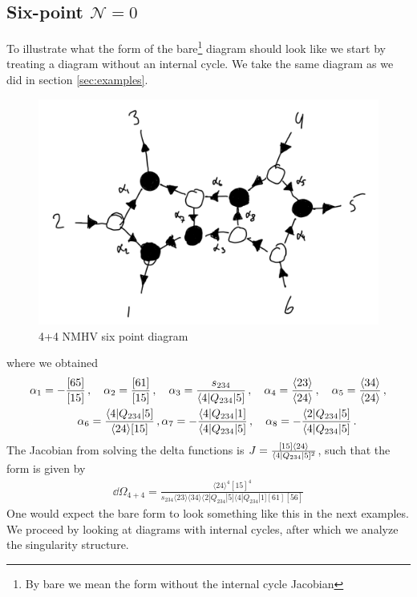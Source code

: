\documentclass[letter,11pt]{article}
\newcommand{\ab}[1]{\langle #1 \rangle}
\newcommand{\sqb}[1]{[ #1 ]}
\newcommand{\aMs}[3]{\langle #1|#2|#3]}  		%
\newcommand{\sab}[1]{s_{#1}}
\newcommand{\twhite}[1]{\textcolor{white}{#1}}
\begin{document}
\subsection{Six-point $\mathcal{N}=0$}
To illustrate what the form of the bare\footnote{By bare we mean the form without the internal cycle Jacobian} diagram should look like we start by treating a diagram without an internal cycle.  We take the same diagram as we did in section \ref{sec:examples}.
\begin{figure}[H]
	\centering
	\includegraphics[width=0.5\linewidth]{6ptYM}
	\caption{4+4 NMHV six point diagram}
	\label{fig:5pt}
\end{figure}
where we obtained
\begin{align*}
	& \alpha_1 = -\frac{[65]}{[15]}\,, \quad \alpha_2 = \frac{[61]}{[15]}\,, \quad \alpha_3 = \frac{\sab{234}}{\aMs{4}{Q_{234}}{5}}\,, \quad \alpha_4 = \frac{\ab{23}}{\ab{24}}\,, \quad
	\alpha_5 = \frac{\ab{34}}{\ab{24}}\,, \\ 
	& \twhite{.}\hspace{1.4cm} 
	\alpha_6 = \frac{\aMs{4}{Q_{234}}{5}}{\ab{24}\sqb{15}}\,, \alpha_7 = -\frac{\aMs{4}{Q_{234}}{1}}{\aMs{4}{Q_{234}}{5}}\,,\quad
	\alpha_8 = - \frac{\aMs{2}{Q_{234}}{5}}{\aMs{4}{Q_{234}}{5}}\,.
\end{align*}
The Jacobian from solving the delta functions is $		J=\frac{[15]\expval{24}}{\aMs{4}{Q_{234}}{5}^2}$,
such that the form is given by
\begin{equation}
	\begin{aligned}
		\dd\Omega_{4+4}=\frac{\ab{24}^4 \sqb{15}^4}{s_{234}\ab{23}\ab{34}\aMs{2}{Q_{234}}{5}\aMs{4}{Q_{234}}{1}\sqb{61}\sqb{56}}
	\end{aligned}
\end{equation}
One would expect the bare form to look something like this in the next examples. We proceed by looking at diagrams with internal cycles, after which we analyze the singularity structure.
\end{document}
